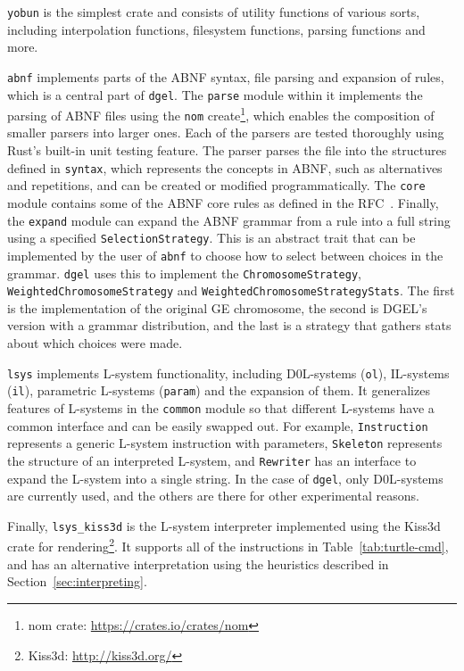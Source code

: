 \texttt{yobun} is the simplest crate and consists of utility functions of various sorts, including interpolation functions, filesystem functions, parsing functions and more.

\texttt{abnf} implements parts of the ABNF syntax, file parsing and expansion of rules, which is a central part of \texttt{dgel}.
The \texttt{parse} module within it implements the parsing of ABNF files using the \texttt{nom} create\footnote{nom crate: \url{https://crates.io/crates/nom}}, which enables the composition of smaller parsers into larger ones.
Each of the parsers are tested thoroughly using Rust's built-in unit testing feature.
The parser parses the file into the structures defined in \texttt{syntax}, which represents the concepts in ABNF, such as alternatives and repetitions, and can be created or modified programmatically.
The \texttt{core} module contains some of the ABNF core rules as defined in the RFC~\cite{RFC5234}.
Finally, the \texttt{expand} module can expand the ABNF grammar from a rule into a full string using a specified \texttt{SelectionStrategy}.
This is an abstract trait that can be implemented by the user of \texttt{abnf} to choose how to select between choices in the grammar.
\texttt{dgel} uses this to implement the \texttt{ChromosomeStrategy}, \texttt{WeightedChromosomeStrategy} and \texttt{WeightedChromosomeStrategyStats}.
The first is the implementation of the original \gls{GE} chromosome, the second is \gls{DGEL}'s version with a grammar distribution, and the last is a strategy that gathers stats about which choices were made.

\texttt{lsys} implements \gls{L-system} functionality, including D0L-systems (\texttt{ol}), IL-systems (\texttt{il}), parametric \glspl{L-system} (\texttt{param}) and the expansion of them.
It generalizes features of \glspl{L-system} in the \texttt{common} module so that different \glspl{L-system} have a common interface and can be easily swapped out.
For example, \texttt{Instruction} represents a generic \gls{L-system} instruction with parameters, \texttt{Skeleton} represents the structure of an interpreted \gls{L-system}, and \texttt{Rewriter} has an interface to expand the \gls{L-system} into a single string.
In the case of \texttt{dgel}, only D0L-systems are currently used, and the others are there for other experimental reasons.

Finally, \texttt{lsys\_kiss3d} is the \gls{L-system} interpreter implemented using the Kiss3d crate for rendering\footnote{Kiss3d: \url{http://kiss3d.org/}}.
It supports all of the instructions in Table~\ref{tab:turtle-cmd}, and has an alternative interpretation using the heuristics described in Section~\ref{sec:interpreting}.

